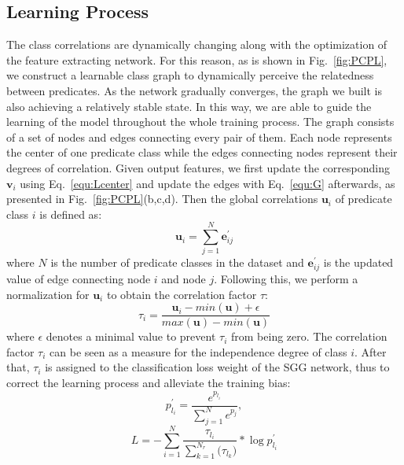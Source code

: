\documentclass[sigconf]{acmart}
\begin{document}
\subsection{Learning Process}
The class correlations are dynamically changing along with the optimization of the feature extracting network. For this reason, as is shown in Fig.~\ref{fig:PCPL}, we construct a learnable class graph to dynamically perceive the relatedness between predicates. As the network gradually converges, the graph we built is also achieving a relatively stable state. In this way, we are able to guide the learning of the model throughout the whole training process. The graph consists of a set of nodes and edges connecting every pair of them. Each node represents the center of one predicate class while the edges connecting nodes represent their degrees of correlation. Given output features, we first update the corresponding ${\textbf{v}}_{i}$ using Eq.~\ref{equ:Lcenter} and update the edges with Eq.~\ref{equ:G} afterwards, as presented in Fig.~\ref{fig:PCPL}(b,c,d). Then the global correlations $\textbf{u}_{i}$ of predicate class ${i}$ is defined as:
\begin{equation}\label{eq:factor}
{\textbf{u}}_{i}=\sum_{j=1}^{N}{\textbf{e}}_{ij}^{'}
\end{equation}
where ${N}$ is the number of predicate classes in the dataset and $\textbf{e}_{ij}^{'}$ is the updated value of edge connecting node ${i}$ and node ${j}$.  Following this, we perform a normalization for $\textbf{u}_{i}$ to obtain the correlation factor $\tau$:
\begin{equation}\label{eq:normalize}
    {\tau}_{i}=\frac{{\textbf{u}}_{i}-min({\textbf{u}})+\epsilon}{max({\textbf{u}})-min({\textbf{u}})}
\end{equation}
where $\epsilon$ denotes a minimal value to prevent ${\tau}_{i}$ from being zero. The correlation factor ${\tau}_{i}$ can be seen as a measure for the independence degree of class ${i}$. After that, ${\tau}_{i}$ is assigned to the classification loss weight of the SGG network, thus to correct the learning process and alleviate the training bias:
\begin{equation}\label{eq:softmax}
    p^{'}_{l_i} = \frac{{e}^{p_{{l}_{i}}}}{\sum_{j=1}^{N}{e}^{p_j}}, 
\end{equation}
\begin{equation}\label{eq:weight}
    {L} = -\sum_{i=1}^N\frac{{\tau}_{{l}_{i}}}{\sum_{k=1}^{{N}_{r}}{({\tau}_{{l}_{k}}})}*\log{p^{'}_{{l}_{i}}}
\end{equation}
\end{document}

